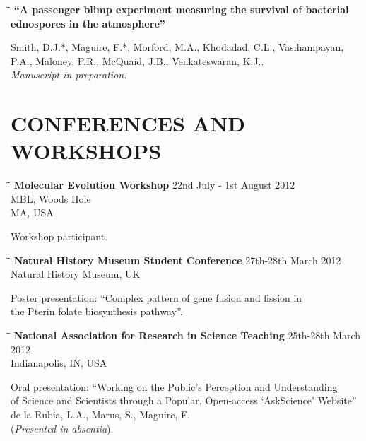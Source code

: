 \documentclass{res}
\begin{document}
\begin{resume}
\vspace{-0.1in}
\begin{tabbing}
   \hspace{2.3in}\= \hspace{2.6in}\= \kill
   {\bf ``A passenger blimp experiment measuring the survival of bacterial ednospores in the atmosphere''}
   \end{tabbing}\vspace{-20pt}
Smith, D.J.*, Maguire, F.*, Morford, M.A., Khodadad, C.L., Vasihampayan, P.A., Maloney, P.R., McQuaid, J.B., Venkateswaran, K.J..\\
\emph{Manuscript in preparation.}



\section{CONFERENCES AND WORKSHOPS}
  \vspace{-0.05in}
  
\begin{tabbing}
\hspace{2in}\= \hspace{2.6in}\= \kill
{\bf Molecular Evolution Workshop} \> \> 22nd July - 1st August 2012\\
\> \> MBL, Woods Hole \\
\> \> MA, USA \\
\end{tabbing}\vspace{-40pt}
Workshop participant.

\vspace{-0.1in}
 \begin{tabbing}
   \hspace{2in}\= \hspace{2.6in}\= \kill 
    {\bf Natural History Museum Student Conference } \>  \> 27th-28th March 2012\\
                        \>     \> Natural History Museum, UK
   \end{tabbing}\vspace{-20pt}      
   
 Poster presentation: ``Complex pattern of gene fusion and fission in \\ the Pterin folate biosynthesis pathway''.
  
  
   \vspace{-0.1in}
   \begin{tabbing}
   \hspace{2in}\= \hspace{2.6in}\= \kill 
   {\bf National Association for Research in Science Teaching } \>  \> 25th-28th March 2012\\
                        \>     \> Indianapolis, IN, USA
   \end{tabbing}\vspace{-20pt}      
Oral presentation: ``Working on the Public's Perception and Understanding \\of Science and Scientists
through a Popular, Open-access `AskScience' Website'' \\
de la Rubia, L.A., Marus, S., Maguire, F. \\
(\emph{Presented in absentia}).
   

\end{resume}
\end{document}
